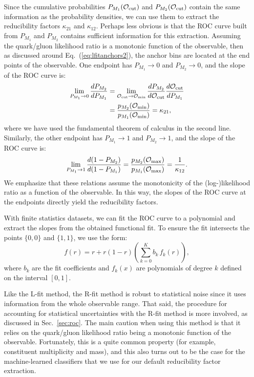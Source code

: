 \documentclass[aps,prd,twocolumn,preprintnumbers,nofootinbib,longbibliography,floatfix]{revtex4-1}
\DeclareRobustCommand{\Sec}[1]{Sec.~\ref{#1}}
\DeclareRobustCommand{\Eq}[1]{Eq.~(\ref{#1})}
\newcommand{\figO}{\mathcal{O}}
\newcommand{\cor}[1]{#1}
\begin{document}
Since the cumulative probabilities $P_{M_1}(\figO_{\rm cut})$ and $P_{M_2}(\figO_{\rm cut})$ contain the same information as the probability densities, we can use them to extract the reducibility factors $\kappa_{21}$ and $\kappa_{12}$.
%
Perhaps less obvious is that the ROC curve built from $P_{M_1}$ and $P_{M_2}$ contains sufficient information for this extraction.
%
Assuming the quark/gluon likelihood ratio is a monotonic function of the observable, then as discussed around \Eq{eq:lfitanchors2}, the anchor bins are located at the end points of the observable.
%
One endpoint has $P_{M_1} \to 0$ and $P_{M_2} \to 0$, and the slope of the ROC curve is:
%
\begin{align}
\nonumber
\lim_{P_{M_1} \to 0} \frac{d P_{M_2}}{d P_{M_1} }& = \lim_{\figO_{\rm cut} \to \figO_{\rm min}} \frac{d P_{M_2}}{d \figO_{\rm cut}} \frac{d \figO_{\rm cut}}{d P_{M_1} }\\
&= \frac{p_{M_2}(\figO_{\rm min})}{p_{M_1}(\figO_{\rm min})} = \kappa_{21},
\label{eq:Rfit_kappa21}
\end{align}
%
where we have used the fundamental theorem of calculus in the second line.
%
Similarly, the other endpoint has $P_{M_1} \to 1$ and $P_{M_2} \to 1$, and the slope of the ROC curve is:
%
\begin{equation}
\lim_{P_{M_1} \to 1} \frac{d (1-P_{M_2})}{d (1- P_{M_1})} = \frac{p_{M_2}(\figO_{\rm max})}{p_{M_1}(\figO_{\rm max})} = \frac{1}{\kappa_{12}}.
\label{eq:Rfit_kappa12}
\end{equation}
%
We emphasize that these relations assume the monotonicity of the (log-)likelihood ratio as a function of the observable.
%
In this way, the slopes of the ROC curve at the endpoints directly yield the reducibility factors.

With finite statistics datasets, we can fit the ROC curve to a polynomial and extract the slopes from the obtained functional fit.
%
To ensure the fit intersects the points $\{0, 0\}$ and $\{1, 1\}$, we use the form:
%
\begin{equation}
	f(r)=r+r\left(1-r\right)\left(\sum_{k=0}^{K}{b_k \,f_k(r)}\right),
	\label{eq:fit_form_roc}
\end{equation}
%
where $b_k$ are the fit coefficients and $f_k\left(x\right)$ are polynomials of degree $k$ defined on the interval $[0, 1]$.


Like the L-fit method, the R-fit method is robust to statistical noise since it uses information from the whole observable range.
%
That said, the procedure for accounting for statistical uncertainties with the R-fit method is more involved, as discussed in \Sec{sec:roc}.
%
The main caution when using this method is that it relies on the quark/gluon likelihood ratio being a monotonic function of the observable.
%
\cor{Fortunately, this is a quite common property (for example, constituent multiplicity and mass), and this also turns out to be the case for the machine-learned classifiers that we use for our default reducibility factor extraction.}
\end{document}
